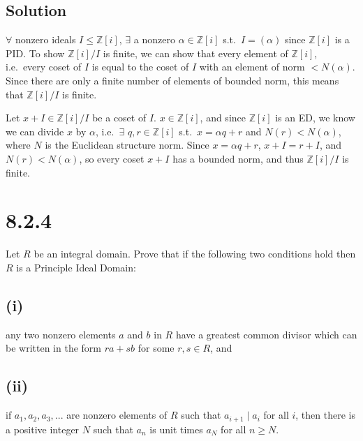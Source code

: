 \documentclass[fleqn]{article}
\begin{document}
        \subsection{Solution}
        $\forall$ nonzero ideals $I \leq \mathbb{Z}[i]$, $\exists$ a nonzero $\alpha \in \mathbb{Z}[i]$ s.t.\ $I = (\alpha)$ since $\mathbb{Z}[i]$ is a PID.  To show $\mathbb{Z}[i]/I$ is finite, we can show that every element of $\mathbb{Z}[i]$, i.e.\ every coset of $I$ is equal to the coset of $I$ with an element of norm $< N(\alpha)$.  Since there are only a finite number of elements of bounded norm, this means that $\mathbb{Z}[i]/I$ is finite.
        
        Let $x + I \in \mathbb{Z}[i]/I$ be a coset of $I$.  $x \in \mathbb{Z}[i]$, and since $\mathbb{Z}[i]$ is an ED, we know we can divide $x$ by $\alpha$, i.e.\ $\exists$ $q, r \in \mathbb{Z}[i]$ s.t.\ $x = \alpha q + r$ and $N(r) < N(\alpha)$, where $N$ is the Euclidean structure norm.  Since $x = \alpha q + r$, $x + I = r + I$, and $N(r) < N(\alpha)$, so every coset $x + I$ has a bounded norm, and thus $\mathbb{Z}[i]/I$ is finite.
    
    \pagebreak
    
    \section{8.2.4}
    Let $R$ be an integral domain.  Prove that if the following two conditions hold then $R$ is a Principle Ideal Domain:
        
        \subsection{(i)}
        any two nonzero elements $a$ and $b$ in $R$ have a greatest common divisor which can be written in the form $ra + sb$ for some $r, s \in R$, and
        
        \subsection{(ii)}
        if $a_1, a_2, a_3, ...$ are nonzero elements of $R$ such that $a_{i + 1} \mid a_i$ for all $i$, then there is a positive integer $N$ such that $a_n$ is unit times $a_N$ for all $n \geq N$.
        
\end{document}

